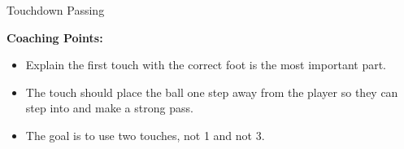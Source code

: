 \begin{evenBlock}{Touchdown Passing}
\begin{minipage}[t]{\linewidth}
\begin{minipage}{.6\linewidth}
    \end{minipage}
\end{minipage}
\raggedright
    \textbf{Coaching Points:}
    \begin{itemize}
        \setlength{\itemsep}{0pt}
        \setlength{\parskip}{0pt}
        \setlength{\parsep}{0pt}
        \item Explain the first touch with the correct foot is the most important part.
        \item The touch should place the ball one step away from the player so they can step into and make a strong pass.
        \item The goal is to use two touches, not 1 and not 3.
    \end{itemize}

\end{evenBlock}